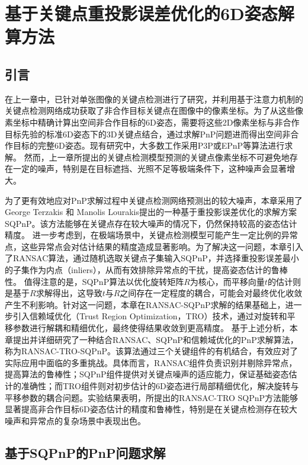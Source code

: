 \chapter{基于关键点重投影误差优化的6D姿态解算方法}
\label{chap:RANSAC-TRO-SQPnP}

\section{引言}
\label{sec:RANSAC-TRO-SQPnP:intro}
在上一章中，已针对单张图像的关键点检测进行了研究，并利用基于注意力机制的关键点检测网络成功获取了非合作目标关键点在图像中的像素坐标。为了从这些像素坐标中精确计算出空间非合作目标的6D姿态，需要将这些2D像素坐标与非合作目标先验的标准6D姿态下的3D关键点结合，通过求解PnP问题进而得出空间非合作目标的完整6D姿态。现有研究中，大多数工作采用P3P\cite{chen2019satellite,s22218541,Guo_2022}或EPnP\cite{li2022learning,huan2020pose,lotti2022investigating}等算法进行求解。
然而，上一章所提出的关键点检测模型预测的关键点像素坐标不可避免地存在一定的噪声，特别是在目标遮挡、光照不足等极端条件下，这种噪声会显著增大。

为了更有效地应对PnP求解过程中关键点检测网络预测出的较大噪声，本章采用了 George Terzakis 和 Manolis Lourakis提出的一种基于重投影误差优化的求解方案SQPnP\cite{terzakis2020consistently}。该方法能够在关键点存在较大噪声的情况下，仍然保持较高的姿态估计精度。
进一步考虑到，在极端场景中，关键点检测模型可能产生一定比例的异常点，这些异常点会对估计结果的精度造成显著影响。为了解决这一问题，本章引入了RANSAC算法，通过随机选取关键点子集输入SQPnP，并选择重投影误差最小的子集作为内点（inliers），从而有效排除异常点的干扰，提高姿态估计的鲁棒性。
值得注意的是，SQPnP算法以优化旋转矩阵$R$为核心，而平移向量$t$的估计则是基于$R$求解得出，这导致$t$与$R$之间存在一定程度的耦合，可能会对最终优化收敛产生不利影响。针对这一问题，本章在RANSAC-SQPnP求解的结果基础上，进一步引入信赖域优化（Trust Region Optimization，TRO）技术，通过对旋转和平移参数进行解耦和精细优化，最终使得结果收敛到更高精度。
基于上述分析，本章提出并详细研究了一种结合RANSAC、SQPnP和信赖域优化的PnP求解算法，称为RANSAC-TRO-SQPnP。该算法通过三个关键组件的有机结合，有效应对了实际应用中面临的多重挑战。具体而言，RANSAC组件负责识别并剔除异常点，提高算法的鲁棒性；SQPnP组件提供对关键点噪声的适应能力，保证基础姿态估计的准确性；而TRO组件则对初步估计的6D姿态进行局部精细优化，解决旋转与平移参数的耦合问题。实验结果表明，所提出的RANSAC-TRO SQPnP方法能够显著提高非合作目标6D姿态估计的精度和鲁棒性，特别是在关键点检测存在较大噪声和异常点的复杂场景中表现出色。


\section{基于SQPnP的PnP问题求解}
\label{sec:RANSAC-TRO-SQPnP:SQPnP}
\vspace{1ex}

